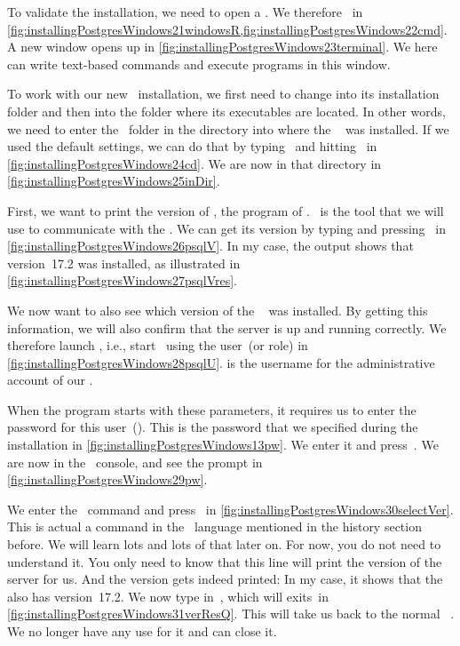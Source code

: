 To validate the installation, we need to open a .
We therefore \windowsTerminal\ in \cref{fig:installingPostgresWindows21windowsR,fig:installingPostgresWindows22cmd}.
A new  window opens up in \cref{fig:installingPostgresWindows23terminal}.
We here can write text-based commands and execute programs in this window.

To work with our new \postgresql\ installation, we first need to change into its installation folder and then into the folder where its executables are located.
In other words, we need to enter the ~folder in the directory into where the \postgresql\  was installed.
If we used the default settings, we can do that by typing~ and hitting~\keys{\enter} in \cref{fig:installingPostgresWindows24cd}.
We are now in that directory in \cref{fig:installingPostgresWindows25inDir}.

First, we want to print the version of \psql, the  program of \postgresql.
\psql\ is the tool that we will use to communicate with the .
We can get its version by typing  and pressing~\keys{\enter} in \cref{fig:installingPostgresWindows26psqlV}.
In my case, the output shows that version~17.2 was installed, as illustrated in \cref{fig:installingPostgresWindows27psqlVres}.

We now want to also see which version of the \postgresql\  was installed.
By getting this information, we will also confirm that the server is up and running correctly.
We therefore launch , i.e., start \psql\ using the user~(or role)  in \cref{fig:installingPostgresWindows28psqlU}.
 is the username for the administrative account of our .

When the program starts with these parameters, it requires us to enter the password for this user~().
This is the password that we specified during the installation in \cref{fig:installingPostgresWindows13pw}.
We enter it and press~\keys{\enter}.
We are now in the \psql\ console, and see the  prompt in \cref{fig:installingPostgresWindows29pw}.

We enter the \sql\ command  and press~\keys{\enter} in \cref{fig:installingPostgresWindows30selectVer}.
This is actual a command in the \sql\ language mentioned in the history section before.
We will learn lots and lots of that later on.
For now, you do not need to understand it.
You only need to know that this line will print the version of the server for us.
And the version gets indeed printed:
In my case, it shows that the \postgresql\  also has version~17.2.
We now type in~, which will exits~\psql in \cref{fig:installingPostgresWindows31verResQ}.
This will take us back to the normal \microsoftWindows\ .
We no longer have any use for it and can close it.

